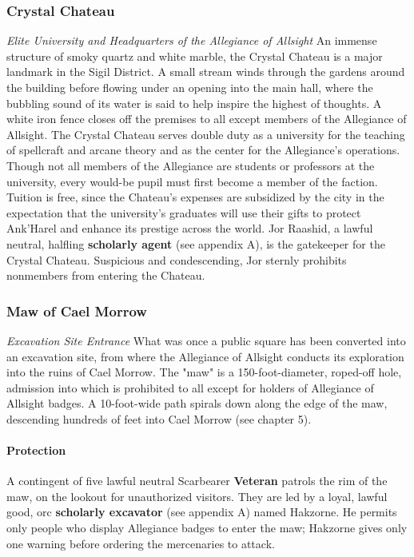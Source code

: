 \documentclass[10pt,a4,twoside,twocolumn,openany,nodeprecatedcode]{dndbook}
\begin{document}
\subsubsection{Crystal Chateau}
\textit{Elite University and Headquarters of the Allegiance of Allsight}
An immense structure of smoky quartz and white marble, the Crystal Chateau is a major landmark in the Sigil District. A small stream winds through the gardens around the building before flowing under an opening into the main hall, where the bubbling sound of its water is said to help inspire the highest of thoughts. A white iron fence closes off the premises to all except members of the Allegiance of Allsight.
The Crystal Chateau serves double duty as a university for the teaching of spellcraft and arcane theory and as the center for the Allegiance's operations. Though not all members of the Allegiance are students or professors at the university, every would-be pupil must first become a member of the faction. Tuition is free, since the Chateau's expenses are subsidized by the city in the expectation that the university's graduates will use their gifts to protect Ank'Harel and enhance its prestige across the world.
Jor Raashid, a lawful neutral, halfling \textbf{scholarly agent} (see appendix A), is the gatekeeper for the Crystal Chateau. Suspicious and condescending, Jor sternly prohibits nonmembers from entering the Chateau.
\subsubsection{Maw of Cael Morrow}
\textit{Excavation Site Entrance}
What was once a public square has been converted into an excavation site, from where the Allegiance of Allsight conducts its exploration into the ruins of Cael Morrow. The "maw" is a 150-foot-diameter, roped-off hole, admission into which is prohibited to all except for holders of Allegiance of Allsight badges. A 10-foot-wide path spirals down along the edge of the maw, descending hundreds of feet into Cael Morrow (see chapter 5).
\paragraph{Protection}
A contingent of five lawful neutral Scarbearer \textbf{Veteran} patrols the rim of the maw, on the lookout for unauthorized visitors. They are led by a loyal, lawful good, orc \textbf{scholarly excavator} (see appendix A) named Hakzorne. He permits only people who display Allegiance badges to enter the maw; Hakzorne gives only one warning before ordering the mercenaries to attack.
\end{document}
